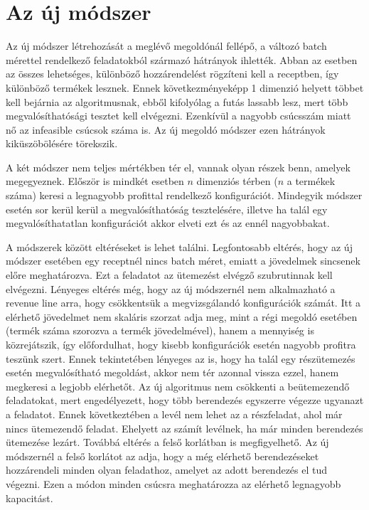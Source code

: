 \chapter{Az új módszer}
Az új módszer létrehozását a meglévő megoldónál fellépő, a változó batch mérettel rendelkező feladatokból származó hátrányok ihlették. Abban az esetben az összes lehetséges, különböző hozzárendelést rögzíteni kell a receptben, így különböző termékek lesznek. Ennek következményeképp 1 dimenzió helyett többet kell bejárnia az algoritmusnak, ebből kifolyólag a futás lassabb lesz, mert több megvalósíthatósági tesztet kell elvégezni. Ezenkívül a nagyobb csúcsszám miatt nő az infeasible csúcsok száma is. Az új megoldó módszer ezen hátrányok kiküszöbölésére törekszik. 

A két módszer nem teljes mértékben tér el, vannak olyan részek benn, amelyek megegyeznek. Először is mindkét esetben $n$ dimenziós térben ($n$ a termékek száma) keresi a legnagyobb profittal rendelkező konfigurációt. Mindegyik módszer esetén sor kerül kerül a megvalósíthatóság tesztelésére, illetve ha talál egy megvalósíthatatlan konfigurációt akkor elveti ezt és az ennél nagyobbakat. 

A módszerek között eltéréseket is lehet találni. Legfontosabb eltérés, hogy az új módszer esetében egy receptnél nincs batch méret, emiatt a jövedelmek sincsenek előre meghatározva. Ezt a feladatot az ütemezést elvégző szubrutinnak kell elvégezni. Lényeges eltérés még, hogy az új módszernél nem alkalmazható a revenue line arra, hogy csökkentsük a megvizsgálandó konfigurációk számát. Itt a elérhető jövedelmet nem skaláris szorzat adja meg, mint a régi megoldó esetében (termék száma szorozva a termék jövedelmével), hanem a mennyiség is közrejátszik, így előfordulhat, hogy kisebb konfigurációk esetén nagyobb profitra teszünk szert. Ennek tekintetében lényeges az is, hogy ha talál egy részütemezés esetén megvalósítható megoldást, akkor nem tér azonnal vissza ezzel, hanem megkeresi a legjobb elérhetőt. Az új algoritmus nem csökkenti a beütemezendő feladatokat, mert engedélyezett, hogy több berendezés egyszerre végezze ugyanazt a feladatot. Ennek következtében a levél nem lehet az a részfeladat, ahol már nincs ütemezendő feladat. Ehelyett az számít levélnek, ha már minden berendezés ütemezése lezárt. Továbbá eltérés a felső korlátban is megfigyelhető. Az új módszernél a felső korlátot az adja, hogy a még elérhető berendezéseket hozzárendeli minden olyan feladathoz, amelyet az adott berendezés el tud végezni. Ezen a módon minden csúcsra meghatározza az elérhető legnagyobb kapacitást.

